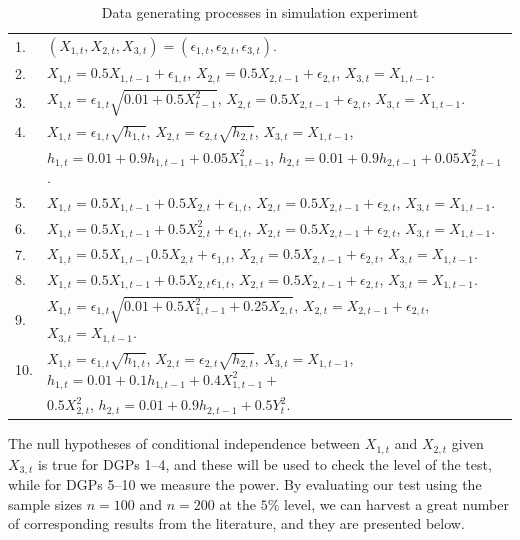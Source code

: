 \documentclass[
  12pt,
  letterpaper]{article}
\theoremstyle{definition}
\theoremstyle{definition}
\theoremstyle{definition}
\theoremstyle{remark}
\begin{document}
\begin{table}[t]
\begin{tabular}{ll}
\hline
1.& $(X_{1,t}, X_{2,t}, X_{3,t}) = (\epsilon_{1,t}, \epsilon_{2,t}, \epsilon_{3,t})$.\\
2.& $X_{1,t} = 0.5X_{1, t-1} + \epsilon_{1,t}$, $X_{2,t} = 0.5X_{2,t-1} + \epsilon_{2,t}$, $X_{3,t} = X_{1,t-1}$.\\
3.& $X_{1,t} = \epsilon_{1,t}\sqrt{0.01 + 0.5X_ {t-1}^2}$, $X_{2,t} = 0.5X_{2, t-1} + \epsilon_{2,t}$, $X_{3,t} = X_{1,t-1}$.\\
4.& $X_{1,t} = \epsilon_{1,t}\sqrt{h_{1,t}}$, $X_{2,t} = \epsilon_{2,t}\sqrt{h_{2,t}}$, $X_{3,t} = X_{1,t-1}$, \\ & $h_{1,t}  = 0.01 + 0.9h_{1,t-1} + 0.05X_{1,t-1}^2$, $h_{2,t} = 0.01 + 0.9h_{2,t-1} + 0.05X_{2,t-1}^2$. \\
5.& $X_{1,t} = 0.5X_{1,t-1} + 0.5X_{2,t} + \epsilon_{1,t}$, $X_{2,t} = 0.5X_{2,t-1} + \epsilon_{2,t}$, $X_{3,t} = X_{1,t-1}$.\\
6.& $X_{1,t} = 0.5X_{1,t-1} + 0.5X_{2,t}^2 + \epsilon_{1,t}$, $X_{2,t} = 0.5X_{2,t-1} + \epsilon_{2,t}$, $X_{3,t} = X_{1,t-1}$.\\
7.& $X_{1,t} = 0.5X_{1,t-1}0.5X_{2,t} + \epsilon_{1,t}$, $X_{2,t} = 0.5X_{2,t-1} + \epsilon_{2,t}$, $X_{3,t} = X_{1,t-1}$.\\
8.& $X_{1,t} = 0.5X_{1,t-1} + 0.5X_{2,t}\epsilon_{1,t}$, $X_{2,t} = 0.5X_{2,t-1} + \epsilon_{2,t}$, $X_{3,t} = X_{1,t-1}$.\\
9.& $X_{1,t} = \epsilon_{1,t}\sqrt{0.01 + 0.5X_{1,t-1}^2 + 0.25X_{2,t}}$, $X_{2,t} = X_{2,t-1} + \epsilon_{2,t}$, $X_{3,t} = X_{1,t-1}$.\\
10. & $X_{1,t} = \epsilon_{1,t}\sqrt{h_{1,t}}$, $X_{2,t} = \epsilon_{2,t}\sqrt{h_{2,t}}$, $X_{3,t} = X_{1,t-1}$, $h_{1,t} = 0.01 + 0.1h_{1, t-1} + 0.4X_{1,t-1}^2 +$ \\ & $0.5X_{2,t}^2$, $h_{2,t} = 0.01 + 0.9h_{2, t-1} + 0.5Y_t^2$.\\
\hline
\end{tabular}
\caption{Data generating processes in simulation experiment}
\label{tab:dgps}
\end{table}

The null hypotheses of conditional independence between \(X_{1,t}\) and \(X_{2,t}\) given \(X_{3,t}\) is true for DGPs 1--4, and these will be used to check the level of the test, while for DGPs 5--10 we measure the power. By evaluating our test using the sample sizes \(n = 100\) and \(n = 200\) at the \(5\%\) level, we can harvest a great number of corresponding results from the literature, and they are presented below.
\end{document}
